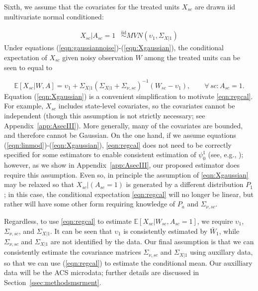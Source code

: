 \documentclass[aoas]{imsart}
\theoremstyle{plain}
\theoremstyle{remark}
\begin{document}
Sixth, we assume that the covariates for the treated units $X_{sc}$ are drawn iid multivariate normal conditioned:

\begin{align} \label{eqn:Xgaussian}
    X_{sc}|A_{sc} = 1 & \stackrel{\text{iid}}{\sim} MVN(\upsilon_1, \Sigma_{X|1})%
\end{align}
%
Under equations (\ref{eqn:gaussiannoise})-(\ref{eqn:Xgaussian}), the conditional expectation of $X_{sc}$ given noisy observation $W$ among the treated units can be seen to equal to

\begin{equation} \label{eqn:regcal}
\mathbb{E}[X_{sc}| W, A] = \upsilon_1 + \Sigma_{X|1} \left(\Sigma_{X|1} + \Sigma_{\nu, sc}\right)^{-1}  (W_{sc} - \upsilon_1), \qquad \forall\, sc: A_{sc} = 1.
\end{equation}
%
Equation (\ref{eqn:Xgaussian}) is a convenient simplification to motivate \eqref{eqn:regcal}. For example, $X_{sc}$ includes state-level covariates, so the covariates cannot be independent (though this assumption is not strictly necessary; see Appendix~\ref{app:AsecIII}). More generally, many of the covariates are bounded, and therefore cannot be Gaussian. On the one hand, if we assume equations (\ref{eqn:linmod})-(\ref{eqn:Xgaussian}), \eqref{eqn:regcal} does not need to be correctly specified for some estimators to enable consistent estimation of $\psi_0^1$ (see, e.g., \cite{gleser1992importance}); however, as we show in Appendix~\ref{app:AsecIII}, our proposed estimator does require this assumption. Even so, in principle the assumption of \eqref{eqn:Xgaussian} may be relaxed so that $X_{sc}|(A_{sc}=1)$ is generated by a different distribution $P_1$; in this case, the conditional expectation \eqref{eqn:regcal} will no longer be linear, but rather will have some other form requiring knowledge of $P_a$ and $\Sigma_{\nu, sc}$.

Regardless, to use \eqref{eqn:regcal} to estimate $\mathbb{E}[X_{sc}|W_{sc}, A_{sc}=1]$, we require $\upsilon_1$, $\Sigma_{\nu,sc}$, and $\Sigma_{X|1}$. It can be seen that $\upsilon_1$ is consistently estimated by $\bar{W}_1$, while $\Sigma_{\nu,sc}$ and $\Sigma_{X|1}$ are not identified by the data. Our final assumption is that we can consistently estimate the covariance matrices $\Sigma_{\nu,sc}$ and $\Sigma_{X|1}$ using auxillary data, so that we can use (\ref{eqn:regcal}) to estimate the conditional mean. Our auxilliary data will be the ACS microdata; further details are discussed in Section~\ref{ssec:methodsmsrment}.
\end{document}
